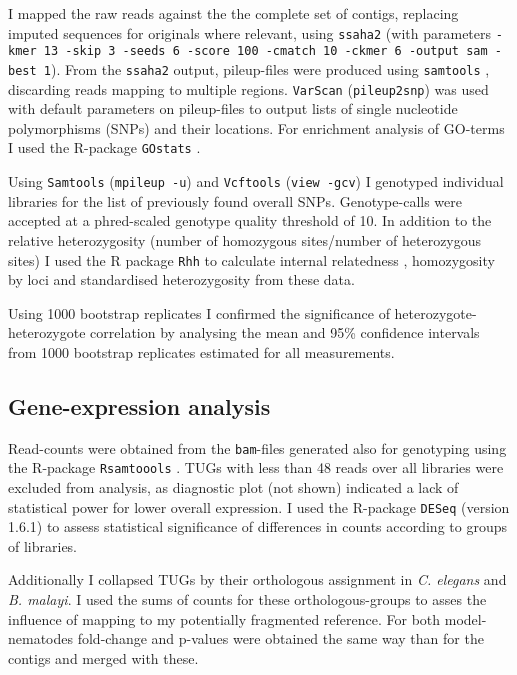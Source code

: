 I mapped the raw reads against the the complete set of contigs,
replacing imputed sequences for originals where relevant, using
\texttt{ssaha2} \cite{pmid11591649} (with parameters \texttt{-kmer 13
  -skip 3 -seeds 6 -score 100 -cmatch 10 -ckmer 6 -output sam -best
  1}). From the \texttt{ssaha2} output, pileup-files were produced
using \texttt{samtools} \cite{journals/bioinformatics/LiHWFRHMAD09},
discarding reads mapping to multiple regions. \texttt{VarScan}
\cite{pmid19542151} (\texttt{pileup2snp}) was used with default
parameters on pileup-files to output lists of single nucleotide
polymorphisms (SNPs) and their locations. For enrichment analysis of
GO-terms I used the R-package \texttt{GOstats} \cite{pmid17098774}.

Using \texttt{Samtools} \cite{journals/bioinformatics/LiHWFRHMAD09}
(\texttt{mpileup -u}) and \texttt{Vcftools} \cite{pmid21653522}
(\texttt{view -gcv}) I genotyped individual libraries for the list of
previously found overall SNPs. Genotype-calls were accepted at a
phred-scaled genotype quality threshold of 10. In addition to the
relative heterozygosity (number of homozygous sites/number of
heterozygous sites) I used the R package \texttt{Rhh}
\cite{pmid21565077} to calculate internal relatedness
\cite{pmid11571049}, homozygosity by loci \cite{pmid17107491} and
standardised heterozygosity \cite{coltman81j} from these data.

Using 1000 bootstrap replicates I confirmed the significance of
heterozygote-heterozygote correlation by analysing the mean and 95\%
confidence intervals from 1000 bootstrap replicates estimated for all
measurements.

\subsection{Gene-expression analysis}

Read-counts were obtained from the \texttt{bam}-files generated also
for genotyping using the R-package \texttt{Rsamtoools}
\cite{rsamtools}. TUGs with less than 48 reads over all libraries were
excluded from analysis, as diagnostic plot (not shown) indicated a
lack of statistical power for lower overall expression. I used the
R-package \texttt{DESeq} \cite{pmid20979621} (version 1.6.1) to assess
statistical significance of differences in counts according to groups
of libraries.

Additionally I collapsed TUGs by their orthologous assignment in
\textit{C. elegans} and \textit{B. malayi}. I used the sums of counts
for these orthologous-groups to asses the influence of mapping to my
potentially fragmented reference. For both model-nematodes fold-change
and p-values were obtained the same way than for the contigs and
merged with these.

